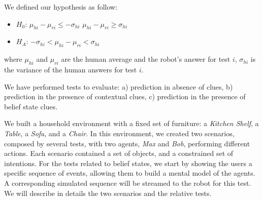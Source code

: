 We defined our hypothesis as follow: 
\begin{itemize}
\item $H_0$: $\mu_{hi}-\mu_{ri}\leq-\sigma_{hi}$ \;  \; $\mu_{hi}-\mu_{ri}\geq\sigma_{hi}$ 
\item $H_A$: $-\sigma_{hi}<\mu_{hi}-\mu_{ri}<\sigma_{hi}$  
\end{itemize}
where $\mu_{hi}$ and $\mu_{ri}$ are the human average and the robot's answer for test $i$, $\sigma_{hi}$ is the variance of the human answers for test $i$.

We have performed tests to evaluate: a) prediction in absence of clues, b) prediction in the presence of contextual clues, c) prediction in the presence of belief state clues.

We built a household environment with a fixed set of furniture: a \textit{Kitchen Shelf}, a \textit{Table}, a \textit{Sofa}, and a \textit{Chair}. In this environment, we created two scenarios, composed by several tests, with two agents, \textit{Max} and \textit{Bob}, performing different actions. Each scenario contained a set of objects, and a constrained set of intentions. For the tests related to belief states, we start by showing the users a specific sequence of events, allowing them to build a mental model of the agents. A corresponding simulated sequence will be streamed to the robot for this test.
We will describe in details the two scenarios and the relative tests.

